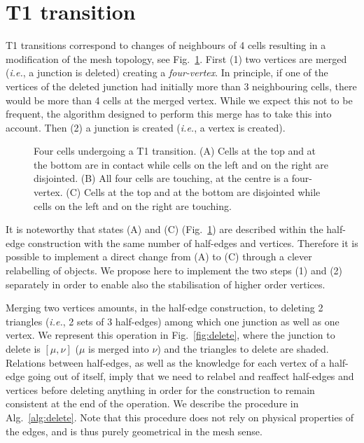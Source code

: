 \documentclass[aps, superscriptaddress, notitlepage]{revtex4-1}
\begin{document}
\section{T1 transition}

T1 transitions correspond to changes of neighbours of 4 cells resulting in a modification of the mesh topology, see Fig.~\ref{fig:t1}. First (1) two vertices are merged (\textit{i.e.}, a junction is deleted) creating a \textit{four-vertex}. In principle, if one of the vertices of the deleted junction had initially more than 3 neighbouring cells, there would be more than 4 cells at the merged vertex. While we expect this not to be frequent, the algorithm designed to perform this merge has to take this into account. Then (2) a junction is created (\textit{i.e.}, a vertex is created).

\begin{figure}[!b]
\centering
\begin{tikzpicture}[scale=0.25*\scale]

\end{tikzpicture}
\caption{Four cells undergoing a T1 transition. (A) Cells at the top and at the bottom are in contact while cells on the left and on the right are disjointed. (B) All four cells are touching, at the centre is a four-vertex. (C) Cells at the top and at the bottom are disjointed while cells on the left and on the right are touching.}
\label{fig:t1}
\end{figure}

It is noteworthy that states (A) and (C) (Fig.~\ref{fig:t1}) are described within the half-edge construction with the same number of half-edges and vertices. Therefore it is possible to implement a direct change from (A) to (C) through a clever relabelling of objects. We propose here to implement the two steps (1) and (2) separately in order to enable also the stabilisation of higher order vertices.

Merging two vertices amounts, in the half-edge construction, to deleting 2 triangles (\textit{i.e.}, 2 sets of 3 half-edges) among which one junction as well as one vertex. We represent this operation in Fig.~\ref{fig:delete}, where the junction to delete is $[\mu, \nu]$ ($\mu$ is merged into $\nu$) and the triangles to delete are shaded. Relations between half-edges, as well as the knowledge for each vertex of a half-edge going out of itself, imply that we need to relabel and reaffect half-edges and vertices before deleting anything in order for the construction to remain consistent at the end of the operation. We describe the procedure in Alg.~\ref{alg:delete}. Note that this procedure does not rely on physical properties of the edges, and is thus purely geometrical in the mesh sense.
\end{document}
